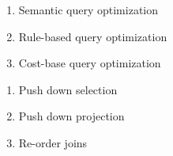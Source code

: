 \begin{minipage}{0.5\linewidth}
\begin{enumerate}
\item Semantic query optimization
\item Rule-based query optimization
\item Cost-base query optimization
\end{enumerate}
\end{minipage}
\begin{minipage}{0.5\linewidth}
\begin{enumerate}
\item Push down selection
\item Push down projection
\item Re-order joins
\end{enumerate}
\end{minipage}
